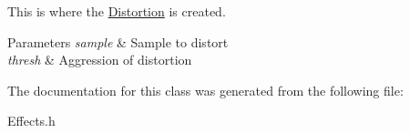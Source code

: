 This is where the \hyperlink{class_distortion}{Distortion} is created. 


\begin{DoxyParams}{Parameters}
{\em sample} & Sample to distort\\
\hline
{\em thresh} & Aggression of distortion \\
\hline
\end{DoxyParams}


The documentation for this class was generated from the following file\+:\begin{DoxyCompactItemize}
\item 
Effects.\+h\end{DoxyCompactItemize}
